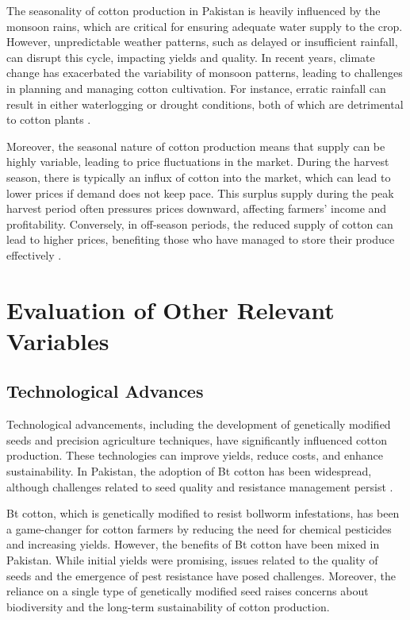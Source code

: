 \documentclass[12pt]{article}
\begin{document}
The seasonality of cotton production in Pakistan is heavily influenced by the monsoon rains, which are critical for ensuring adequate water supply to the crop. However, unpredictable weather patterns, such as delayed or insufficient rainfall, can disrupt this cycle, impacting yields and quality. In recent years, climate change has exacerbated the variability of monsoon patterns, leading to challenges in planning and managing cotton cultivation. For instance, erratic rainfall can result in either waterlogging or drought conditions, both of which are detrimental to cotton plants \cite{usda2022}.

Moreover, the seasonal nature of cotton production means that supply can be highly variable, leading to price fluctuations in the market. During the harvest season, there is typically an influx of cotton into the market, which can lead to lower prices if demand does not keep pace. This surplus supply during the peak harvest period often pressures prices downward, affecting farmers' income and profitability. Conversely, in off-season periods, the reduced supply of cotton can lead to higher prices, benefiting those who have managed to store their produce effectively \cite{oec2023}.

\section{Evaluation of Other Relevant Variables}

\subsection{Technological Advances}

Technological advancements, including the development of genetically modified seeds and precision agriculture techniques, have significantly influenced cotton production. These technologies can improve yields, reduce costs, and enhance sustainability. In Pakistan, the adoption of Bt cotton has been widespread, although challenges related to seed quality and resistance management persist \cite{usda2022, usda2021}.

Bt cotton, which is genetically modified to resist bollworm infestations, has been a game-changer for cotton farmers by reducing the need for chemical pesticides and increasing yields. However, the benefits of Bt cotton have been mixed in Pakistan. While initial yields were promising, issues related to the quality of seeds and the emergence of pest resistance have posed challenges. Moreover, the reliance on a single type of genetically modified seed raises concerns about biodiversity and the long-term sustainability of cotton production.
\end{document}
